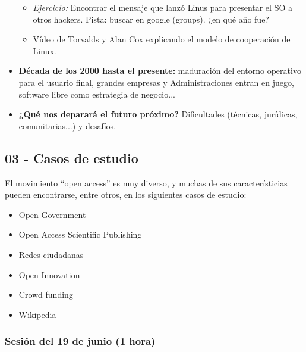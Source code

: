 \documentclass[a4paper,12pt]{article}
\begin{document}
\begin{itemize}
	\begin{itemize}
	\item \textit{Ejercicio:} Encontrar el mensaje que lanzó Linus para presentar el SO a otros hackers. Pista: buscar en google (groups). ¿en qué año fue?
	\item Vídeo de Torvalds y Alan Cox explicando el modelo de cooperación de Linux. 
	\end{itemize}
\item \textbf{Década de los 2000 hasta el presente:} maduración del entorno operativo para el usuario final, grandes empresas y Administraciones entran en juego, software libre como estrategia de negocio...
\item \textbf{¿Qué nos deparará el futuro próximo?} Dificultades (técnicas, jurídicas, comunitarias...) y desafíos.
\end{itemize}


\subsection{03 - Casos de estudio}

El movimiento ``open access'' es muy diverso, y muchas de sus característicias pueden encontrarse, entre otros, en los siguientes casos de estudio:

\begin{itemize}
\item Open Government
\item Open Access Scientific Publishing
\item Redes ciudadanas
\item Open Innovation
\item Crowd funding
\item Wikipedia
\end{itemize}

\subsubsection{Sesión del 19 de junio (1 hora)}
\end{document}
